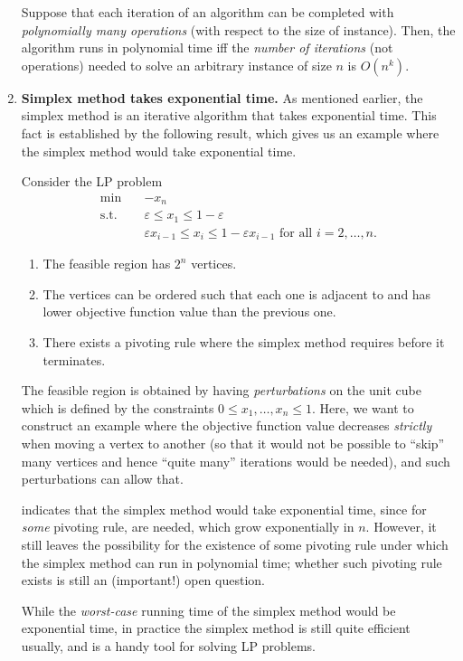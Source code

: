 \begin{enumerate}
Suppose that each iteration of an algorithm can be completed with
\emph{polynomially many operations} (with respect to the size of instance).
Then, the algorithm runs in polynomial time iff the \emph{number of iterations}
(not operations) needed to solve an arbitrary instance of size \(n\) is
\(O(n^k)\).
\item \textbf{Simplex method takes exponential time.} As mentioned earlier, the
simplex method is an iterative algorithm that takes exponential time. This fact
is established by the following result, which gives us an example where the
simplex method would take exponential time.

\begin{proposition}
\label{prp:simplex-expo-time}
Consider the LP problem
\begin{align*}
\text{min}\quad&-x_n \\
\text{s.t.}\quad&\varepsilon\le x_1\le 1-\varepsilon \\
&\varepsilon x_{i-1}\le x_i\le 1-\varepsilon x_{i-1}\text{ for all \(i=2,\dotsc,n\).}
\end{align*}
\begin{enumerate}
\item The feasible region has \(2^n\) vertices.
\item The vertices can be ordered such that each one is adjacent to and has
lower objective function value than the previous one.
\item There exists a pivoting rule where the simplex method requires
 before it terminates.
\end{enumerate}
\end{proposition}
\begin{intuition}
The feasible region is obtained by having \emph{perturbations} on the unit cube
which is defined by the constraints \(0\le x_1,\dotsc,x_n\le 1\). Here, we want
to construct an example where the objective function value decreases
\emph{strictly} when moving a vertex to another (so that it would not be
possible to ``skip'' many vertices and hence ``quite many'' iterations would be
needed), and such perturbations can allow that.
\end{intuition}

 indicates that the simplex method would take
exponential time, since for \emph{some} pivoting rule, 
are needed, which grow exponentially in \(n\). However, it still leaves the
possibility for the existence of some pivoting rule under which the simplex
method can run in polynomial time; whether such pivoting rule exists is still
an (important!) open question.

\begin{note}
While the \emph{worst-case} running time of the simplex method would be
exponential time, in practice the simplex method is still quite efficient
usually, and is a handy tool for solving LP problems.
\end{note}
\end{enumerate}
